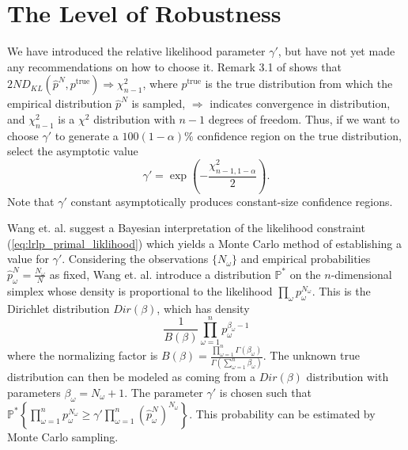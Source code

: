 \documentclass[11pt]{article}
\renewcommand{\P}{\mathbb{P}}
\newcommand{\ptrue}{p^{\text{true}}}
\begin{document}
\section{The Level of Robustness}
\label{sec:robust_level}

We have introduced the relative likelihood parameter $\gamma'$, but have not yet made any recommendations on how to choose it.
Remark 3.1 of \cite{pardo2005statistical} shows that $2ND_{KL}(\hat{p}^N, \ptrue) \Rightarrow \chi^2_{n-1}$, where $\ptrue$ is the true distribution from which the empirical distribution $\hat{p}^N$ is sampled, $\Rightarrow$ indicates convergence in distribution, and $\chi^2_{n-1}$ is a $\chi^2$ distribution with $n-1$ degrees of freedom.
Thus, if we want to choose $\gamma'$ to generate a $100(1-\alpha)\%$ confidence region on the true distribution, select the asymptotic value
\begin{equation} \label{eq:asymptotic_gamma}
	\gamma' = \exp \left( -\frac{\chi^2_{n-1,1-\alpha}}{2} \right).
\end{equation}
Note that $\gamma'$ constant asymptotically produces constant-size confidence regions.

Wang et. al. \cite{wang2010likelihood} suggest a Bayesian interpretation of the likelihood constraint (\ref{eq:lrlp_primal_liklihood}) which yields a Monte Carlo method of establishing a value for $\gamma'$.
Considering the observations $\{N_\omega\}$ and empirical probabilities $\hat{p}^N_\omega = \frac{N_\omega}{N}$ as fixed, Wang et. al. \cite{wang2010likelihood} introduce a distribution $\P^*$ on the $n$-dimensional simplex whose density is proportional to the likelihood $\prod_\omega p_\omega^{N_\omega}$.
This is the Dirichlet distribution $Dir(\beta)$, which has density
\[
	\frac{1}{B(\beta)} \prod_{\omega=1}^n p_\omega^{\beta_\omega-1}
\]
where the normalizing factor is $B(\beta) = \frac{\prod_{\omega=1}^n \Gamma(\beta_\omega)}{\Gamma\left( \sum_{\omega=1}^n \beta_\omega \right)}$.
The unknown true distribution can then be modeled as coming from a $Dir(\beta)$ distribution with parameters $\beta_\omega = N_\omega + 1$.
The parameter $\gamma'$ is chosen such that $\P^*\left\{ \prod_{\omega=1}^n p_\omega^{N_\omega} \geq \gamma' \prod_{\omega=1}^n (\hat{p}^N_\omega)^{N_\omega} \right\}$.
This probability can be estimated by Monte Carlo sampling.
\end{document}
